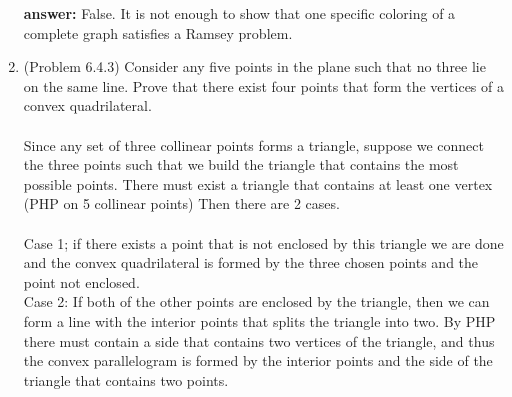 \documentclass{amsart}
\begin{document}
\begin{enumerate}
\textbf{answer:} False. It is not enough to show that one specific coloring of a complete graph satisfies a Ramsey problem. \\

\vspace{1in}

\item (Problem 6.4.3) Consider any five points in the plane such that no three lie on the same line. Prove that there exist four points that form the vertices of a convex quadrilateral.\\\\
Since any set of three collinear points forms a triangle, suppose we connect the three points such that we build the triangle that contains the most  possible points. There must exist a triangle that contains at least one vertex (PHP on 5 collinear points)  Then there are 2 cases.\\\\
Case 1; if there exists a point that is not enclosed by this triangle we are done and the convex quadrilateral is formed by the three chosen points and the point not enclosed.\\

\noindent Case 2: If both of the other points are enclosed by the triangle, then we can form a line with the interior points that splits the triangle into two. By PHP there must contain a side that contains two vertices of the triangle, and thus the convex parallelogram is formed by the interior points and the side of the triangle that contains two points. \\


\vspace{1in}


\end{enumerate}
\end{document}
